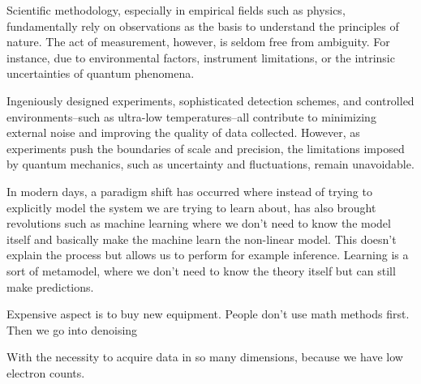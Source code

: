 Scientific methodology, especially in empirical fields such as physics, fundamentally rely on observations as the basis to understand the principles of nature. The act of measurement, however, is seldom free from ambiguity. For instance, due to environmental factors, instrument limitations, or the intrinsic uncertainties of quantum phenomena. 

Ingeniously designed experiments, sophisticated detection schemes, and controlled environments--such as ultra-low temperatures--all contribute to minimizing external noise and improving the quality of data collected. However, as experiments push the boundaries of scale and precision, the limitations imposed by quantum mechanics, such as uncertainty and fluctuations, remain unavoidable.


In modern days, a paradigm shift has occurred where instead of trying to explicitly model the system we are trying to learn about, 
has also brought revolutions such as machine learning where we don't need to know the model itself and basically make the machine learn the non-linear model. This doesn't explain the process but allows us to perform for example inference. Learning is a sort of metamodel, where we don't need to know the theory itself but can still make predictions.


Expensive aspect is to buy new equipment. People don't use math methods first.
Then we go into denoising 

With the necessity to acquire data in so many dimensions, because we have low electron counts.


